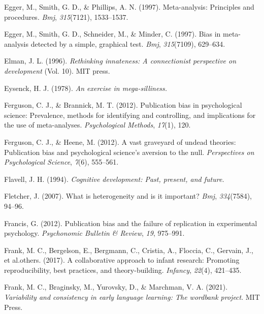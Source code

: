 \documentclass[
  man]{apa6}
\newlength{\cslhangindent}
\newlength{\cslentryspacingunit} %
\newenvironment{CSLReferences}[2] %
 {%
  \setlength{\parindent}{0pt}
  \ifodd #1
  \let\oldpar\par
  \def\par{\hangindent=\cslhangindent\oldpar}
  \fi
  \setlength{\parskip}{#2\cslentryspacingunit}
 }%
 {}
\begin{document}
\begin{CSLReferences}{1}{0}
\leavevmode{}%
Egger, M., Smith, G. D., \& Phillips, A. N. (1997). Meta-analysis: Principles and procedures. \emph{Bmj}, \emph{315}(7121), 1533--1537.

\leavevmode{}%
Egger, M., Smith, G. D., Schneider, M., \& Minder, C. (1997). Bias in meta-analysis detected by a simple, graphical test. \emph{Bmj}, \emph{315}(7109), 629--634.

\leavevmode{}%
Elman, J. L. (1996). \emph{Rethinking innateness: A connectionist perspective on development} (Vol. 10). MIT press.

\leavevmode{}%
Eysenck, H. J. (1978). \emph{An exercise in mega-silliness.}

\leavevmode{}%
Ferguson, C. J., \& Brannick, M. T. (2012). Publication bias in psychological science: Prevalence, methods for identifying and controlling, and implications for the use of meta-analyses. \emph{Psychological Methods}, \emph{17}(1), 120.

\leavevmode{}%
Ferguson, C. J., \& Heene, M. (2012). A vast graveyard of undead theories: Publication bias and psychological science's aversion to the null. \emph{Perspectives on Psychological Science}, \emph{7}(6), 555--561.

\leavevmode{}%
Flavell, J. H. (1994). \emph{Cognitive development: Past, present, and future.}

\leavevmode{}%
Fletcher, J. (2007). What is heterogeneity and is it important? \emph{Bmj}, \emph{334}(7584), 94--96.

\leavevmode{}%
Francis, G. (2012). Publication bias and the failure of replication in experimental psychology. \emph{Psychonomic Bulletin \& Review}, \emph{19}, 975--991.

\leavevmode{}%
Frank, M. C., Bergelson, E., Bergmann, C., Cristia, A., Floccia, C., Gervain, J., et al.others. (2017). A collaborative approach to infant research: Promoting reproducibility, best practices, and theory-building. \emph{Infancy}, \emph{22}(4), 421--435.

\leavevmode{}%
Frank, M. C., Braginsky, M., Yurovsky, D., \& Marchman, V. A. (2021). \emph{Variability and consistency in early language learning: The wordbank project}. MIT Press.


\end{CSLReferences}
\end{document}
